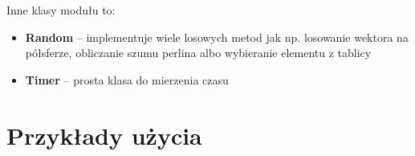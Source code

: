 \documentclass[inz,longabstract]{iithesis}
\begin{document}
            Inne klasy modułu to:
            \begin{itemize}
                \item \textbf{Random} -- implementuje wiele losowych metod jak np. losowanie wektora na półsferze, obliczanie szumu perlina albo wybieranie elementu z tablicy
                \item \textbf{Timer} -- prosta klasa do mierzenia czasu  
            \end{itemize}
\chapter{Przykłady użycia}





\end{document}
